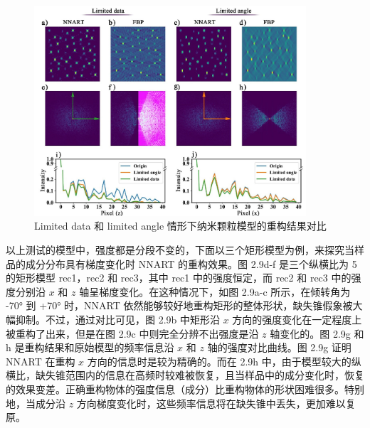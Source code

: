 \begin{figure}[H]
	\vspace{\baselineskip}
	\centering
	\includegraphics[width=0.9\textwidth]{../3.14/314}
	\caption{Limited data 和 limited angle 情形下纳米颗粒模型的重构结果对比}\label{fig:314}
	\song{}
\end{figure}

以上测试的模型中，强度都是分段不变的，下面以三个矩形模型为例，来探究当样品的成分分布具有梯度变化时 NNART 的重构效果。图 2.9d-f 是三个纵横比为 5 的矩形模型 rec1，rec2 和 rec3，其中 rec1 中的强度恒定，而 rec2 和 rec3 中的强度分别沿 $x$ 和 $z$ 轴呈梯度变化。在这种情况下，如图 2.9a-c 所示，在倾转角为 -70° 到 +70° 时，NNART 依然能够较好地重构矩形的整体形状，缺失锥假象被大幅抑制。不过，通过对比可见，图 2.9b 中矩形沿 $x$ 方向的强度变化在一定程度上被重构了出来，但是在图 2.9c 中则完全分辨不出强度是沿 $z$ 轴变化的。图 2.9g 和 h 是重构结果和原始模型的频率信息沿 $x$ 和 $z$ 轴的强度对比曲线。图 2.9g 证明 NNART 在重构 $x$ 方向的信息时是较为精确的。而在 2.9h 中，由于模型较大的纵横比，缺失锥范围内的信息在高频时较难被恢复，且当样品中的成分变化时，恢复的效果变差。正确重构物体的强度信息（成分）比重构物体的形状困难很多。特别地，当成分沿 $z$ 方向梯度变化时，这些频率信息将在缺失锥中丢失，更加难以复原。

